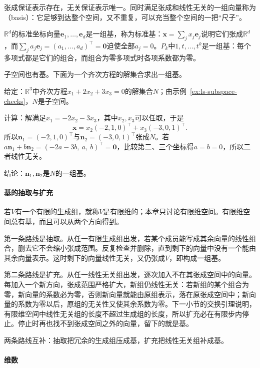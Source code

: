 张成保证表示存在，无关保证表示唯一。同时满足张成和线性无关的一组向量称为（basis）：它足够到达整个空间，又不重复，可以充当整个空间的一把“尺子”。

$\mathbb R^d$的标准坐标向量$\bm e_1,\ldots,\bm e_d$是一组基，称为标准基：$\bm x=\sum_jx_j\bm e_j$说明它们张成$\mathbb R^d$，而$\sum_ja_j\bm e_j=(a_1,\ldots,a_d)^\top=\bm0$迫使全部$a_j=0$。$P_k$中$1,t,\ldots,t^k$是一组基：每个多项式都是它们的组合，而组合为零多项式时各项系数都为零。

子空间也有基。下面为一个齐次方程的解集合求出一组基。
\begin{example}[齐次方程解平面的一组基]
\label{ex:ls-solution-plane-basis}
给定：$\mathbb R^3$中齐次方程$x_1+2x_2+3x_3=0$的解集合$N$；由示例~\ref{ex:ls-subspace-checks}，$N$是子空间。

计算：解满足$x_1=-2x_2-3x_3$，其中$x_2,x_3$可以任取，于是
\[
 \bm x=x_2(-2,1,0)^\top+x_3(-3,0,1)^\top .
\]
所以$\bm n_1=(-2,1,0)^\top$与$\bm n_2=(-3,0,1)^\top$张成$N$。若$a\bm n_1+b\bm n_2=(-2a-3b,\ a,\ b)^\top=\bm0$，比较第二、三个坐标得$a=b=0$，所以二者线性无关。

结论：$\bm n_1,\bm n_2$是$N$的一组基。
\end{example}

\paragraph{基的抽取与扩充}
若$V$有一个有限的生成组，就称$V$是有限维的；本章只讨论有限维空间。有限维空间总有基，而且可以从两个方向得到。

第一条路线是抽取。从任一有限生成组出发，若某个成员能写成其余向量的线性组合，删去它不会缩小张成范围。反复检查并删除，直到剩下的向量中没有一个能由其余向量表示。这时剩下的向量线性无关，又仍张成$V$，即构成一组基。

第二条路线是扩充。从任一线性无关组出发，逐次加入不在其张成空间中的向量。每加入一个新方向，张成范围严格扩大，新组仍线性无关：若新组的某个组合为零，新向量的系数必为零，否则新向量就能由原组表示，落在原张成空间中；新向量的系数为零以后，原组的无关性又使其余系数为零。下一小节的交换引理说明，有限维空间中线性无关组的长度不超过生成组的长度，所以扩充必在有限步内停止。停止时再也找不到张成空间之外的向量，留下的就是基。

两条路线互补：抽取把冗余的生成组压成基，扩充把线性无关组补成基。

\paragraph{维数}
\label{sec:ls-dimension}

